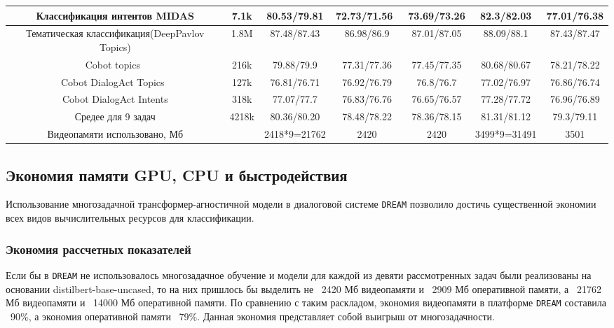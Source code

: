 \begin{table}[htbp]
{\begin{tabular}{|c||c|c|c|c|c|c|}
Классификация интентов MIDAS                    & 7.1k  & 80.53/79.81  & 72.73/71.56~ & 73.69/73.26 & 82.3/82.03   & 77.01/76.38 \\ \hline
Тематическая классификация(DeepPavlov Topics) & 1.8M  & 87.48/87.43  & 86.98/86.9   & 87.01/87.05                  & 88.09/88.1   & 87.43/87.47 \\ \hline
Cobot topics~                                   & 216k  & 79.88/79.9   & 77.31/77.36  & 77.45/77.35                  & 80.68/80.67  & 78.21/78.22 \\ \hline
Cobot DialogAct Topics~                         & 127k  & 76.81/76.71  & 76.92/76.79  & 76.8/76.7                    & 77.02/76.97  & 76.86/76.74 \\ \hline
Cobot DialogAct Intents                         & 318k  & 77.07/77.7   & 76.83/76.76  & 76.65/76.57                  & 77.28/77.72  & 76.96/76.89 \\ \hline
Средее для 9 задач                                     & 4218k & 80.36/80.20       & 78.48/78.22  & 78.36/78.15                  & 81.31/81.12    & 79.3/79.11  \\ \hline
Видеопамяти использовано, Мб                             &       & 2418*9=21762 & 2420         & 2420                         & 3499*9=31491 & 3501        \\ \hline
\end{tabular}
}
\end{table}

\subsection{Экономия памяти GPU, CPU и быстродействия} 
\label{economy}
Использование многозадачной трансформер-агностичной модели в диалоговой системе \texttt{DREAM} позволило достичь существенной экономии всех видов вычислительных ресурсов для классификации.
\subsubsection{Экономия рассчетных показателей} 
\label{economy_predicted} 
 Если бы в \texttt{DREAM} не использовалось многозадачное обучение и модели для каждой из девяти рассмотренных задач были реализованы на основании  distilbert-base-uncased, то на них пришлось бы выделить не ~2420 Мб видеопамяти и ~2909 Мб оперативной памяти, а ~21762 Мб видеопамяти и ~14000 Мб оперативной памяти. По сравнению с таким раскладом, экономия видеопамяти в платформе \texttt{DREAM} составила ~90\%, а экономия оперативной памяти ~79\%. Данная экономия представляет собой выигрыш от многозадачности.

